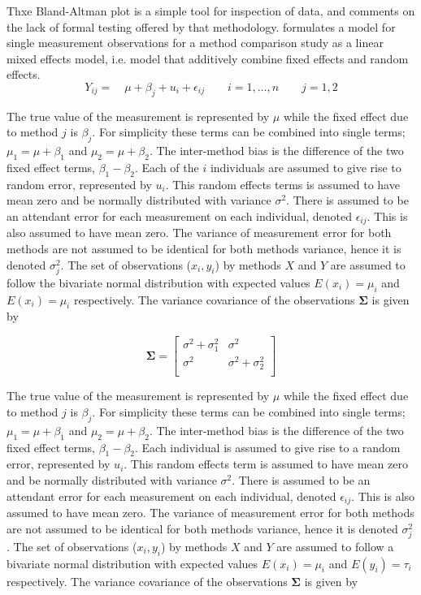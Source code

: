 \documentclass[12pt, a4paper]{report}
\theoremstyle{plain}
\theoremstyle{definition}
\theoremstyle{remark}
\begin{document}
	\bigskip
		Thxe Bland-Altman plot is a simple tool for inspection of data, and
		\citet{Kinsella} comments on the lack of formal testing offered by
		that methodology. \citet{Kinsella} formulates a model for
		single measurement observations for a method comparison study as a
		linear mixed effects model, i.e. model that additively combine
		fixed effects and random effects.
		\[
		Y_{ij} =\quad \mu + \beta_{j} + u_{i} + \epsilon_{ij} \qquad i = 1,\dots,n
		\qquad j=1,2\]
		
	\bigskip
		The true value of the measurement is represented by $\mu$ while the fixed effect due to method $j$ is $\beta_{j}$.
		For simplicity these terms can be combined into single terms; $\mu_{1} = \mu+ \beta_{1}$ and $\mu_{2} = \mu + \beta_{2}$. The inter-method bias is the difference of the two fixed effect terms, $\beta_{1}-\beta_{2}$. Each of the $i$ individuals are assumed to give rise to random error, represented by $u_{i}$. This random effects terms is assumed to have mean zero and be normally distributed with variance $\sigma^2$. There is assumed to be an attendant error for each measurement on each individual, denoted $\epsilon_{ij}$. This is also assumed to have mean zero. The variance of measurement error for both methods are not assumed to be identical for both methods variance,  hence it is denoted $\sigma^2_{j}$. The set of observations ($x_{i},y_{i}$) by methods $X$ and $Y$ are assumed to follow the bivariate normal distribution with expected values $E(x_{i})= \mu_{i}$ and $E(x_{i})= \mu_{i}$ respectively. The variance covariance of the observations $\boldsymbol{\Sigma}$ is given by
		
		\[
		\boldsymbol{\Sigma} = \left[
		\begin{array}{cc}
		\sigma^{2} + \sigma^{2}_{1} & \sigma^{2} \\
		\sigma^{2} & \sigma^{2} + \sigma^{2}_{2} \\
		\end{array}
		\right]
		\]
		
	\bigskip
	The true value of the measurement is represented by $\mu$ while the fixed effect due to method $j$ is $\beta_{j}$.
	For simplicity these terms can be combined into single terms; $\mu_{1} = \mu+ \beta_{1}$ and $\mu_{2} = \mu + \beta_{2}$. The inter-method bias is the difference of the two fixed effect terms, $\beta_{1}-\beta_{2}$. Each individual is assumed to give rise to a random error, represented by $u_{i}$. This random effects term is assumed to have mean zero and be normally distributed with variance $\sigma^2$. There is assumed to be an attendant error for each measurement on each individual, denoted $\epsilon_{ij}$. This is also assumed to have mean zero. The variance of measurement error for both methods are not assumed to be identical for both methods variance,  hence it is denoted $\sigma^2_{j}$. The set of observations ($x_{i},y_{i}$) by methods $X$ and $Y$ are assumed to follow a bivariate normal distribution with expected values $E(x_{i})= \mu_{i}$ and $E(y_{i})= \tau_{i}$ respectively. The variance covariance of the observations $\boldsymbol{\Sigma}$ is given by
	
\end{document}
